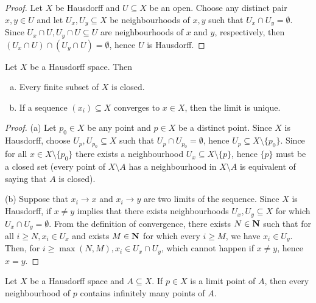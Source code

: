 \begin{proof}
    Let \(X\) be Hausdorff and \(U \subseteq X\) be an open. Choose any
    distinct pair \(x, y \in U\) and let \(U_x, U_y \subseteq X\) be neighbourhoods
    of \(x, y\) such that \(U_x \cap U_y = \emptyset\). Since \(U_x \cap U, U_y
    \cap U \subseteq U\) are neighbourhoods of \(x\) and \(y\), respectively, then
    \((U_x \cap U) \cap (U_y \cap U) = \emptyset\), hence \(U\) is Hausdorff.
\end{proof}

\begin{proposition}
    \label{prop: Hausdorff properties}
    Let \(X\) be a Hausdorff space. Then
    \begin{enumerate}[(a)]
        \item Every finite subset of \(X\) is closed.
        \item If a sequence \((x_i) \subseteq X\) converges to \(x \in X\), then the
              limit is unique.
    \end{enumerate}
\end{proposition}

\begin{proof}
    (a) Let \(p_0 \in X\) be any point and \(p \in X\) be a distinct point. Since
    \(X\) is Hausdorff, choose \(U_p, U_{p_0} \subseteq X\) such that \(U_p \cap
    U_{p_0} = \emptyset\), hence  \(U_p \subseteq X \setminus \{p_0\}\). Since for all
    \(x \in X \setminus \{p_0\}\) there exists a neighbourhood \(U_x
    \subseteq X \setminus \{p\}\), hence \(\{p\}\) must be a closed set (every
    point of \(X \setminus A\) has a neighbourhood in \(X \setminus A\) is
    equivalent of saying that \(A\) is closed).

    (b) Suppose that \(x_i \to x\) and \(x_i \to y\) are two limits of the
    sequence. Since \(X\) is Hausdorff, if \(x \neq y\) implies that there exists
    neighbourhoods \(U_x, U_y \subseteq X\) for which \(U_x \cap U_y =
    \emptyset\). From the definition of convergence, there exists \(N \in
    \mathbf{N}\) such that for all \(i \geq N, x_i \in U_x\) and exists \(M \in \mathbf{N}\)
    for which every \(i \geq M\), we have \(x_i \in U_y\). Then, for \(i \geq
    \max(N, M), x_i \in U_x \cap U_y\), which cannot happen if \(x \neq y\), hence
    \(x = y\).
\end{proof}

\begin{proposition}
    \label{prop:nbhd-limit-pt}
    Let \(X\) be a Hausdorff space and \(A \subseteq X\). If \(p \in X\) is a
    limit point of \(A\), then every neighbourhood of \(p\) contains infinitely
    many points of \(A\).
\end{proposition}

